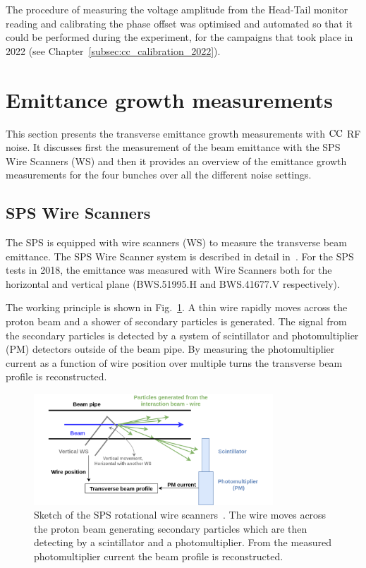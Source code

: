 The procedure of measuring the voltage amplitude from the Head-Tail monitor reading and calibrating the phase offset was optimised and automated so that it could be performed during the experiment, for the campaigns that took place in 2022 (see Chapter~\ref{subsec:cc_calibration_2022}). 

\section{Emittance growth measurements}\label{sec:emit_growth_meas_2018}
This section presents the transverse emittance growth measurements with ${\mathrm{CC}}$ RF noise. It discusses first the measurement of the beam emittance with the SPS Wire Scanners (WS) and then it provides an overview of the emittance growth measurements for the four bunches over all the different noise settings.

\subsection{SPS Wire Scanners}\label{subsec:sps_ws}
The SPS is equipped with wire scanners (WS) to measure the transverse beam emittance. The SPS Wire Scanner system is described in detail in~\cite{BOSSER1985475, Berrig:1972478}. For the SPS tests in 2018, the emittance was measured with Wire Scanners both for the horizontal and vertical plane (BWS.51995.H and BWS.41677.V respectively).

The working principle is shown in Fig.~\ref{fig:SPS_WS_ROT}. A thin wire rapidly moves across the proton beam and a shower of secondary particles is generated. The signal from the secondary particles is detected by a system of scintillator and photomultiplier (PM) detectors outside of the beam pipe. By measuring the photomultiplier current as a function of wire position over multiple turns the transverse beam profile is reconstructed. 

\begin{figure}[!h]
   \centering         
   \includegraphics[width=0.8\textwidth]{images/Ch5/Wire_scanner.png}
       \caption{Sketch of the SPS rotational wire scanners~\cite{Berrig:1972478}. The wire moves across the proton beam generating secondary particles which are then detecting by a scintillator and a photomultiplier. From the measured photomultiplier current the beam profile is reconstructed.}
       \label{fig:SPS_WS_ROT}
\end{figure}
